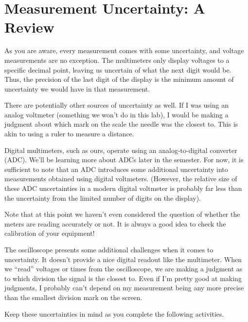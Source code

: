 \section{Measurement Uncertainty: A Review}

As you are aware, every measurement comes with some uncertainty, and voltage
measurements are no exception. The multimeters only display voltages to a 
specific decimal point, leaving us uncertain of what the next digit would be.
Thus, the precision of the last digit of the display is the minimum amount
of uncertainty we would have in that measurement. 

There are potentially other sources of uncertainty as well. If I was using an
analog voltmeter (something we won't do in this lab), I would be making a 
judgment about which mark on the scale the needle was the closest to. This is
akin to using a ruler to measure a distance. 

Digital multimeters, such as ours, operate using an analog-to-digital converter
(ADC). We'll be learning more about ADCs later in the semester. For now, it is
sufficient to note that an ADC introduces some additional uncertainty into 
measurements obtained using digital voltmeters. (However, the relative size 
of these ADC uncertainties in a modern digital voltmeter is probably far less
than the uncertainty from the limited number of digits on the display).

Note that at this point we haven't even considered the question of whether
the meters are reading accurately or not. It is always a good idea to check
the calibration of your equipment!
 
The oscilloscope presents some additional challenges when it comes to 
uncertainty. It doesn't provide a nice digital readout like the multimeter.
When we ``read'' voltages or times from the oscilloscope, we are making
a judgment as to which division the signal is the closest to. Even if I'm 
pretty good at making judgments, I probably can't depend on my measurement 
being any more precise than the smallest division mark on the screen.

Keep these uncertainties in mind as you complete the following activities.

